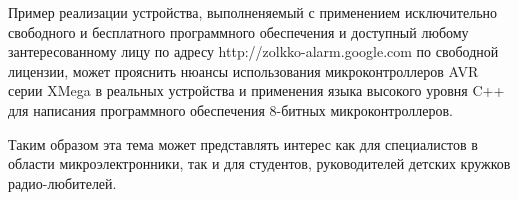 \begin{par}
Пример реализации устройства, выполненяемый с применением исключительно свободного и бесплатного
программного обеспечения и доступный любому зантересованному лицу по адресу http://zolkko-alarm.google.com
по свободной лицензии, может прояснить нюансы использования микроконтроллеров AVR серии
XMega в реальных устройства и применения языка высокого уровня C++ для написания программного
обеспечения 8-битных микроконтроллеров.
\end{par}

\begin{par}
Таким образом эта тема может представлять интерес как для специалистов в области микроэлектронники,
так и для студентов, руководителей детских кружков радио-любителей.
\end{par}

\newpage{}
